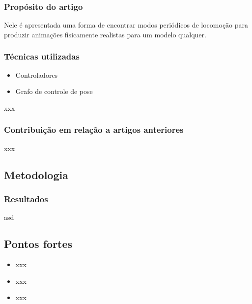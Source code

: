 \subsubsection{Propósito do artigo}

Nele é apresentada uma forma de encontrar modos periódicos de locomoção para produzir animações fisicamente realistas para um modelo qualquer.

\subsubsection{Técnicas utilizadas} 
 \begin{itemize}
   \item Controladores
   \item Grafo de controle de pose
 \end{itemize}  
xxx

\subsubsection{Contribuição em relação a artigos anteriores} %
xxx

\subsection{Metodologia}



\subsubsection{Resultados}
asd

\subsection{Pontos fortes} %
\begin{itemize}
  \item xxx
  \item xxx
  \item xxx
\end{itemize}  

